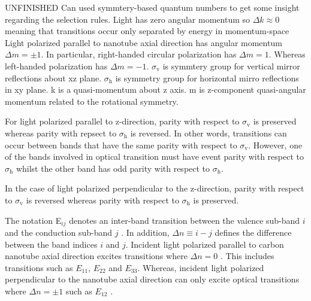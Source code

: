 {\color{red} UNFINISHED} Can used symmtery-based quantum numbers to get some insight regarding the selection rules. Light has zero angular momentum so $\Delta k \approx 0$ meaning that transitions occur only separated by energy in momentum-space \cite{bovzovic2000optical}
Light polarized parallel to nanotube axial direction has angular momentum $\Delta m = \pm 1$. In particular, right-handed circular polarization has $\Delta m = 1$. Whereas left-handed polarization has $\Delta m = -1$. $\sigma_\text{v}$ is symmtery group for vertical mirror reflections about xz plane. $\sigma_\text{h}$ is symmetry group for horizontal mirro reflections in xy plane. k is a quasi-momentum about z axis. m is z-component quasi-angular momentum related to the rotational symmetry.

For light polarized parallel to z-direction, parity with respect to $\sigma_\text{v}$ is preserved whereas parity with repsect to $\sigma_\text{h}$ is reversed. In other words, transitions can occur between bands that have the same parity with respect to $\sigma_\text{v}$. However, one of the bands involved in optical transition must have event parity with respect to $\sigma_\text{h}$ whilst the other band has odd parity with respect to $\sigma_\text{h}$.

In the case of light polarized perpendicular to the z-direction, parity with respect to $\sigma_\text{v}$ is reversed whereas parity with respect to $\sigma_\text{h}$ is preserved.

The notation E$_{ij}$ denotes an inter-band transition between the valence sub-band $i$ and the conduction sub-band $j$ \cite{weismanKonoBook}. In addition, $\Delta n \equiv i - j$ defines the difference between the band indices $i$ and $j$.  Incident light polarized parallel to carbon nanotube axial direction excites transitions where $\Delta n = 0$ \cite{weismanKonoBook}. This includes transitions such as $E_{11}$, $E_{22}$ and $E_{33}$. Whereas, incident light polarized perpendicular to the nanotube axial direction can only excite optical transitions where $\Delta n = \pm 1$ such as $E_{12}$ \cite{weismanKonoBook}.

